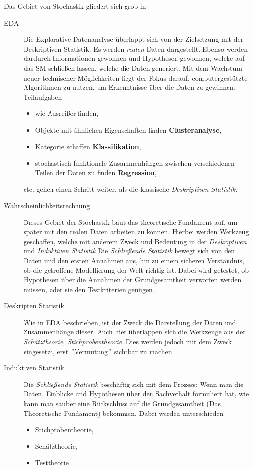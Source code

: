 Das Gebiet von Stochastik gliedert sich grob in 
\begin{description}
	\item[\gls{EDA}] Die Explorative Datenanalyse überlappt sich von der Zielsetzung mit der Deskriptiven Statistik. Es werden \textit{realen} Daten dargestellt. Ebenso werden dardurch Informationen gewonnen und Hypothesen gewonnen, welche auf das \gls{SM} schließen lassen, welche die Daten generiert. Mit dem Wachstum neuer technischer Möglichkeiten liegt der Fokus darauf, computergestützte Algorithmen zu nutzen, um Erkenntnisse über die Daten zu gewinnen. Teilaufgaben 
	\begin{itemize}
		\item wie Ausreißer finden, 
		\item Objekte mit ähnlichen Eigenschaften finden \textbf{Clusteranalyse},
		\item Kategorie schaffen \textbf{Klassifikation},
		\item stochastisch-funktionale Zusammenhängen zwischen verschiedenen Teilen der Daten zu finden \textbf{Regression},
	\end{itemize}
etc. gehen einen Schritt weiter, als die klassische \textit{Deskriptiven Statistik}.
	\item[Wahrscheinlichkeitsrechnung] Dieses Gebiet der Stochastik baut das theoretische Fundament auf, um später mit den realen Daten arbeiten zu können. Hierbei werden Werkzeug geschaffen, welche mit anderem Zweck und Bedeutung in der \textit{Deskriptiven} und \textit{Induktiven Statistik} Die \textit{Schließende Statistik} bewegt sich von den Daten und den ersten Annahmen aus, hin zu einem sicheren Verständnis, ob die getroffene Modellierung der Welt richtig ist. Dabei wird getestet, ob Hypothesen über die Annahmen der Grundgesamtheit verworfen werden müssen, oder sie den Testkriterien genügen. 
\item[Deskripten Statistik] Wie in \gls{EDA} beschrieben, ist der Zweck die Darstellung der Daten und Zusammenhänge dieser. Auch hier überlappen sich die Werkzeuge aus der \textit{Schätztheorie}, \textit{Stichprobentheorie}. Dies werden jedoch mit dem Zweck eingesetzt, erst $"$Vermutung$"$ sichtbar zu machen. 
\item[Induktiven Statistik] Die \textit{Schließende Statistik} beschäftig sich mit dem Prozess: Wenn man die Daten, Einblicke und Hypothesen über den Sachverhalt formuliert hat, wie kann man sauber eine Rückschluss auf die Grundgesamtheit (Das Theoretische Fundament) bekommen. Dabei werden unterschieden 
\begin{itemize}
	\item Stichprobentheorie, 
	\item Schätztheorie,
	\item Testtheorie
\end{itemize}
\end{description}

